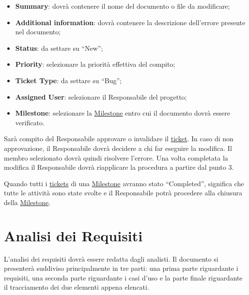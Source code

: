 \begin{enumerate}
\begin{itemize}
\item \textbf{Summary}: dovrà contenere il nome del documento o file da modificare;
\item \textbf{Additional information}: dovrà contenere la descrizione dell'errore presente nel documento;
\item \textbf{Status}: da settare su ``New'';
\item \textbf{Priority}: selezionare la priorità effettiva del compito;
\item \textbf{Ticket Type}: da settare su ``Bug'';
\item \textbf{Assigned User}: selezionare il Responsabile del progetto;
\item \textbf{Milestone}: selezionare la \underline{Milestone} entro cui il documento dovrà essere verificato.
\end{itemize}
Sarà  compito del Responsabile approvare o invalidare il \underline{ticket}. In caso di non approvazione, il Responsabile dovrà decidere a chi far eseguire la modifica. Il membro selezionato dovrà quindi risolvere l'errore. Una volta completata la modifica il Responsabile dovrà riapplicare la procedura a partire dal punto 3.
\end{enumerate}
Quando tutti i \underline{tickets} di una \underline{Milestone} avranno stato ``Completed'', significa che tutte le attività sono state svolte e il Responsabile potrà procedere alla chiusura della \underline{Milestone}.

\newpage
\section{Analisi dei Requisiti}
L'analisi dei requisiti dovrà essere redatta dagli analisti. Il documento si presenterà suddiviso principalmente in tre parti: una prima parte riguardante i requisiti, una seconda parte riguardante i casi d'uso e la parte finale riguardante il tracciamento dei due elementi appena elencati.

